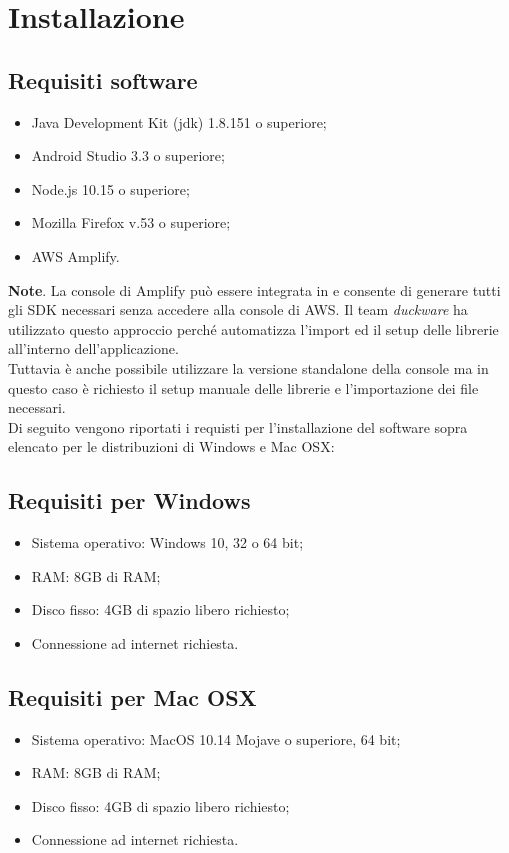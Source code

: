 \pagebreak
\section{Installazione}
\label{sec:installazione}
\subsection{Requisiti software}
\begin{itemize}
    \item Java Development Kit (jdk) 1.8.151 o superiore;
    \item Android Studio 3.3 o superiore;
    \item Node.js 10.15 o superiore;
    \item Mozilla Firefox v.53 o superiore;
    \item AWS Amplify.
\end{itemize}
\textbf{Note}. La console di Amplify può essere integrata in  e consente di generare tutti gli SDK necessari senza accedere alla console di AWS. Il team \textit{duckware} ha utilizzato questo approccio perché automatizza l'import ed il setup delle librerie all'interno dell'applicazione.\\[0.25cm]
Tuttavia è anche possibile utilizzare la versione standalone della console ma in questo caso è richiesto il setup manuale delle librerie e l'importazione dei file necessari.\\[0.25cm]Di seguito vengono riportati i requisti per l'installazione del software sopra elencato per le distribuzioni di Windows e Mac OSX:
\subsection{Requisiti per Windows}
\begin{itemize}
    \item Sistema operativo: Windows 10, 32 o 64 bit;
    \item RAM: 8GB di RAM;
    \item Disco fisso: 4GB di spazio libero richiesto;
    \item Connessione ad internet richiesta.
\end{itemize}
\subsection{Requisiti per Mac OSX}
\begin{itemize}
    \item Sistema operativo: MacOS 10.14 Mojave o superiore, 64 bit;
    \item RAM: 8GB di RAM;
    \item Disco fisso: 4GB di spazio libero richiesto;
    \item Connessione ad internet richiesta.
\end{itemize}

